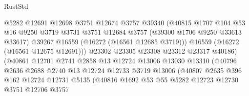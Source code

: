\begin{lexlean}{RustStd}
\begin{coremodule}
                                @5282
                                @12691
                                @12698
                                @3751
                                @12674
                                @3757
                                @39340
                                (@40815
                                  @1707
                                  @104
                                  @53
                                  @16
                                  @9250
                                  @3719
                                  @3731
                                  @3751
                                  @12684
                                  @3757
                                  (@39300 @1706 @9250 @33613 @33617)
                                  @39267
                                  @16559
                                  (@16272 (@16561 @12685 @3719)))
                                @16559
                                (@16272 (@16561 @12675 @12691)))
                              @23302
                              @23305
                              @23308
                              @23312
                              @23317
                              @40186)
                            (@40861
                              @12701
                              @2741
                              @2858
                              @13
                              @12724
                              @13006
                              @13030
                              @13310
                              (@40796
                                @2636
                                @2688
                                @2740
                                @13
                                @12724
                                @12733
                                @3719
                                @13006
                                (@40807
                                  @2635
                                  @396
                                  @162
                                  @12724
                                  @12731
                                  @5135
                                  (@40816
                                    @1692
                                    @53
                                    @55
                                    @5282
                                    @12723
                                    @12730
                                    @3751
                                    @12706
                                    @3757

\end{coremodule}
\end{lexlean}
